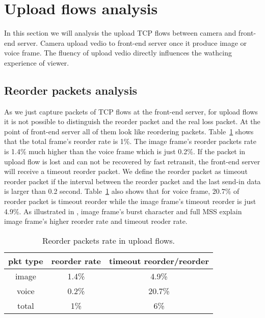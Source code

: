 
\section{Upload flows analysis}
\label{sec:upload-connection}

In this section we will analysis the upload TCP flows between camera and front-end server. Camera upload vedio to front-end server once it produce image or voice frame. The fluency of upload vedio directly influences the wathcing experience of viewer. 

\subsection{Reorder packets analysis}
\label{sub:reorder}

As we just capture packets of TCP flows at the front-end server, for upload flows it is not possible to distinguish the reorder packet and the real loss packet. At the point of front-end server all of them look like reordering packets. Table~\ref{tbl:reorder-rate} shows that the total frame's reorder rate is 1\%. The image frame's reorder packets rate is 1.4\% much higher than the voice frame which is just 0.2\%.  If the packet in upload flow is lost and can not be recovered by fast retransit, the front-end server will receive a timeout reorder packet. We define the reorder packet as timeout reorder packet if the interval between the reorder packet and the last send-in data is larger than 0.2 second. Table~\ref{tbl:reorder-rate} also shows that for voice frame, 20.7\% of reorder packet is timeout reorder while the image frame's timeout reorder is just 4.9\%. As illustrated in \label{sub:diff-gra-voice}, image frame's burst character and full MSS explain image frame's higher reorder rate and timeout reoder rate. 

\begin{table}[ht]
\tablefontsize
\renewcommand{\arraystretch}{\assize}
 \setlength{\tabcolsep}{3pt}
\caption{Reorder packets rate in upload flows.}
\centering
\begin{tabular}{c|c|c}
	\toprule
	pkt type & reorder rate & timeout reorder/reorder \\
	\hline
	image & 1.4\% & 4.9\% \\
	\hline
	voice & 0.2\% & 20.7\% \\
	\hline
	total & 1\% & 6\% \\
	\bottomrule
\end{tabular}
\label{tbl:reorder-rate}
\termspace
\end{table} 

